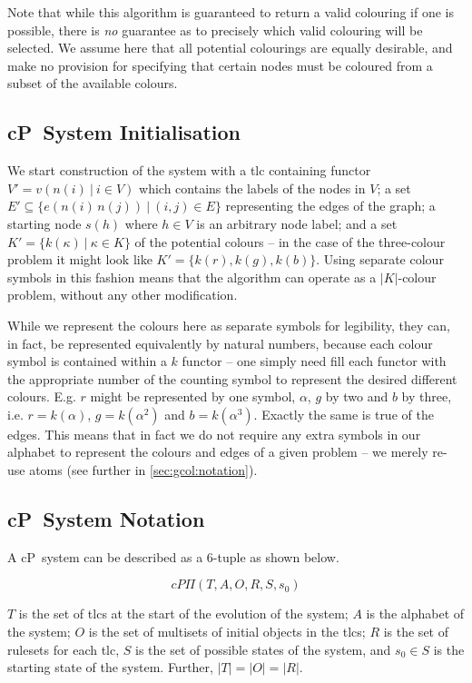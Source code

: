 Note that while this algorithm is guaranteed to return a valid colouring if one is possible, there is \emph{no} guarantee as to precisely which valid colouring will be selected.  We assume here that all potential colourings are equally desirable, and make no provision for specifying that certain nodes must be coloured from a subset of the available colours.

\subsection{\label{sec:gcol:sysinit}cP~System Initialisation}
We start construction of the system with a \gls{tlc} containing functor \(V' = v(n(i)~|~i \in V)\) which contains the labels of the nodes in \(V\); a set \(E' \subseteq \{e(n(i)\,n(j))~|~(i,j) \in E\}\) representing the edges of the graph; a starting node \(s(h)\) where \(h \in V\) is an arbitrary node label; and a set \(K' = \{k(\kappa)~|~\kappa \in K\}\) of  the potential colours -- in the case of the three-colour problem it might look like \(K' = \{k(r), k(g), k(b)\}\). Using separate colour symbols in this fashion means that the algorithm can operate as a \(|K|\)-colour problem, without any other modification.

While we represent the colours here as separate symbols for legibility, they can, in fact, be represented equivalently by natural numbers, because each colour symbol is contained within a \(k\) functor -- one simply need fill each functor with the appropriate number of the counting symbol to represent the desired different colours.  E.g. \(r\) might be represented by one symbol, \(\alpha\), \(g\) by two and \(b\) by three, i.e. \(r = k(\alpha)\), \(g = k(\alpha^2)\) and \(b = k(\alpha^3)\).  Exactly the same is true of the edges.  This means that in fact we do not require any extra symbols in our alphabet to represent the colours and edges of a given problem -- we merely re-use atoms (see further in \cref{sec:gcol:notation}).

\subsection{\label{sec:gcol:notation}cP~System Notation}
A cP~system can be described as a 6-tuple as shown below.

\[
cP\Pi(T, A, O, R, S, s_0)
\]

\(T\) is the set of \gls{tlc}s at the start of the evolution of the system; \(A\) is the alphabet of the system; \(O\) is the set of multisets of initial objects in the \gls{tlc}s; \(R\) is the set of rulesets for each \gls{tlc}, \(S\) is the set of possible states of the system, and \(s_0 \in S\) is the starting state of the system. Further, \(|T| = |O| = |R|\).

